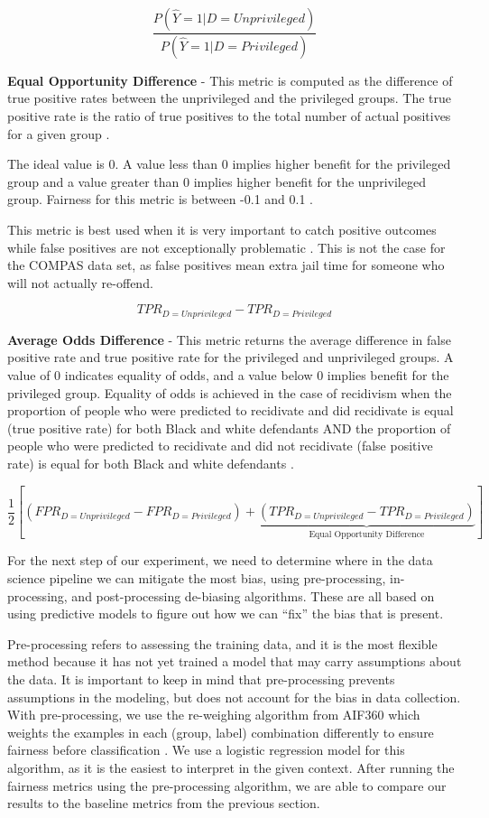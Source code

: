 \documentclass[water,article,submit,moreauthors,pdftex]{mdpi}
\begin{document}
\[\frac{P(\hat{Y}=1|D=Unprivileged)}{P(\hat{Y}=1|D=Privileged)}\]

\textbf{Equal Opportunity Difference} - This metric is computed as the
difference of true positive rates between the unprivileged and the
privileged groups. The true positive rate is the ratio of true positives
to the total number of actual positives for a given group
\citep{GoogleDev}.

The ideal value is 0. A value less than 0 implies higher benefit for the
privileged group and a value greater than 0 implies higher benefit for
the unprivileged group. Fairness for this metric is between -0.1 and 0.1
\citep{aif360-oct-2018}.

This metric is best used when it is very important to catch positive
outcomes while false positives are not exceptionally problematic
\citep{Cortez2019How}. This is not the case for the COMPAS data set, as
false positives mean extra jail time for someone who will not actually
re-offend.

\[TPR_{D = Unprivileged} - TPR_{D = Privileged}\]

\textbf{Average Odds Difference} - This metric returns the average
difference in false positive rate and true positive rate for the
privileged and unprivileged groups. A value of 0 indicates equality of
odds, and a value below 0 implies benefit for the privileged group.
Equality of odds is achieved in the case of recidivism when the
proportion of people who were predicted to recidivate and did recidivate
is equal (true positive rate) for both Black and white defendants AND
the proportion of people who were predicted to recidivate and did not
recidivate (false positive rate) is equal for both Black and white
defendants \citep{aif360-oct-2018}.

\[\frac{1}{2}\left[(FPR_{D = Unprivileged} - FPR_{D = Privileged}) + \underbrace{(TPR_{D = Unprivileged} - TPR_{D = Privileged})}_\textrm{Equal Opportunity Difference}\right]\]

For the next step of our experiment, we need to determine where in the
data science pipeline we can mitigate the most bias, using
pre-processing, in-processing, and post-processing de-biasing
algorithms. These are all based on using predictive models to figure out
how we can ``fix'' the bias that is present.

Pre-processing refers to assessing the training data, and it is the most
flexible method because it has not yet trained a model that may carry
assumptions about the data. It is important to keep in mind that
pre-processing prevents assumptions in the modeling, but does not
account for the bias in data collection. With pre-processing, we use the
re-weighing algorithm from AIF360 which weights the examples in each
(group, label) combination differently to ensure fairness before
classification \citep{aif360-oct-2018}. We use a logistic regression
model for this algorithm, as it is the easiest to interpret in the given
context. After running the fairness metrics using the pre-processing
algorithm, we are able to compare our results to the baseline metrics
from the previous section.
\end{document}
